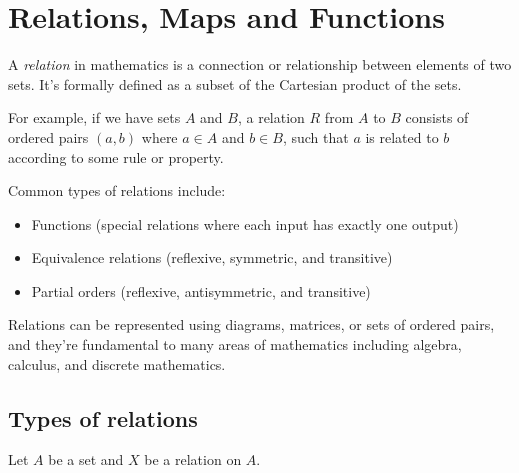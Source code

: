 \newpage
\section{Relations, Maps and Functions}

A \emph{relation} in mathematics is a connection or relationship between elements of two sets. It's 
formally defined as a subset of the Cartesian product of the sets.
\vspace{\baselineskip}

For example, if we have sets \(A\) and \(B\), a relation \(R\) from \(A\) to \(B\) consists
of ordered pairs \((a,b)\) where \(a \in A\) and \(b \in B\), such that \(a\) is related to \(b\) 
according to some rule or property.
\vspace{\baselineskip}

Common types of relations include:

\begin{itemize}

	\item Functions (special relations where each input has exactly one output)

	\item Equivalence relations (reflexive, symmetric, and transitive)

	\item Partial orders (reflexive, antisymmetric, and transitive)

\end{itemize}

Relations can be represented using diagrams, matrices, or sets of
ordered pairs, and they're fundamental to many areas of mathematics including algebra, calculus, and 
discrete mathematics.

\subsection{Types of relations}

Let \(A\) be a set and \(X\) be a relation on \(A\).


